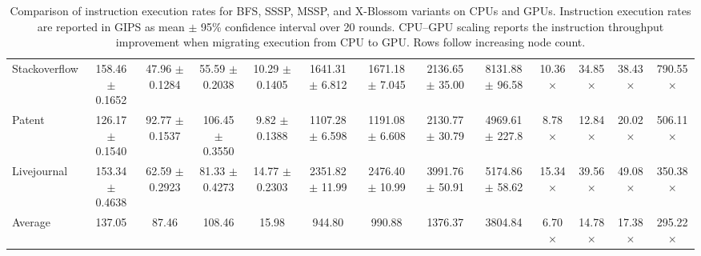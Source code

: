 \begin{table}[H]
{\begin{tabular}{l|cccc|cccc|cccc}
Stackoverflow & 158.46 $\pm$ 0.1652 & 47.96 $\pm$ 0.1284 & 55.59 $\pm$ 0.2038 & 10.29 $\pm$ 0.1405 & 1641.31 $\pm$ 6.812 & 1671.18 $\pm$ 7.045 & 2136.65 $\pm$ 35.00 & 8131.88 $\pm$ 96.58 & 10.36$\times$ & 34.85$\times$ & 38.43$\times$ & 790.55$\times$ \\
Patent        & 126.17 $\pm$ 0.1540 & 92.77 $\pm$ 0.1537 & 106.45 $\pm$ 0.3550 & 9.82 $\pm$ 0.1388 & 1107.28 $\pm$ 6.598 & 1191.08 $\pm$ 6.608 & 2130.77 $\pm$ 30.79 & 4969.61 $\pm$ 227.8 & 8.78$\times$ & 12.84$\times$ & 20.02$\times$ & 506.11$\times$ \\
Livejournal   & 153.34 $\pm$ 0.4638 & 62.59 $\pm$ 0.2923 & 81.33 $\pm$ 0.4273 & 14.77 $\pm$ 0.2303 & 2351.82 $\pm$ 11.99 & 2476.40 $\pm$ 10.99 & 3991.76 $\pm$ 50.91 & 5174.86 $\pm$ 58.62 & 15.34$\times$ & 39.56$\times$ & 49.08$\times$ & 350.38$\times$ \\
\midrule
Average       & 137.05 & 87.46 & 108.46 & 15.98 & 944.80 & 990.88 & 1376.37 & 3804.84 & 6.70$\times$ & 14.78$\times$ & 17.38$\times$ & 295.22$\times$ \\
\bottomrule
\end{tabular}
}
\captionsetup{skip=4pt}
\caption{
Comparison of instruction execution rates for BFS, SSSP, MSSP, and X-Blossom variants on CPUs and GPUs.
Instruction execution rates are reported in GIPS as mean $\pm$ 95\% confidence interval over 20 rounds.
CPU--GPU scaling reports the instruction throughput improvement when migrating execution from CPU to GPU.
Rows follow increasing node count.
}
\label{tab:pe-ci}
\vspace{-4pt}
\end{table}
